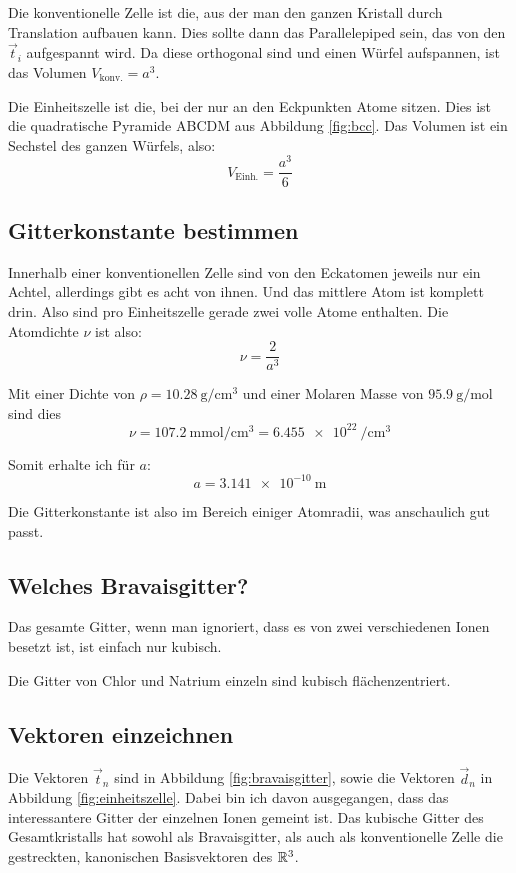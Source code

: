 Die konventionelle Zelle ist die, aus der man den ganzen Kristall durch
Translation aufbauen kann. Dies sollte dann das Parallelepiped sein, das von
den $\vec t_i$ aufgespannt wird. Da diese orthogonal sind und einen Würfel
aufspannen, ist das Volumen $V_\text{konv.} = a^3$.

Die Einheitszelle ist die, bei der nur an den Eckpunkten Atome sitzen. Dies ist
die quadratische Pyramide ABCDM aus Abbildung \ref{fig:bcc}. Das Volumen ist
ein Sechstel des ganzen Würfels, also:
\[
	V_\text{Einh.} = \frac{a^3}6
\]

\subsection{Gitterkonstante bestimmen}

Innerhalb einer konventionellen Zelle sind von den Eckatomen jeweils nur ein
Achtel, allerdings gibt es acht von ihnen. Und das mittlere Atom ist komplett
drin. Also sind pro Einheitszelle gerade zwei volle Atome enthalten. Die
Atomdichte $\nu$ ist also:
\[
	\nu = \frac{2}{a^3}
\]

Mit einer Dichte von $\rho = \SI{10.28}{\gram\per\centi\meter\cubed}$ und einer
Molaren Masse von $\SI{95.9}{\gram\per\mol}$ sind dies
\[
	\nu
	= \SI{107.2}{\milli\mol\per\centi\meter\cubed}
	= \SI{6.455e22}{\per\centi\meter\cubed}
\]

Somit erhalte ich für $a$:
\[
	a = \SI{3.141e-10}{\meter}
\]

Die Gitterkonstante ist also im Bereich einiger Atomradii, was anschaulich gut
passt.

\subsection{Welches Bravaisgitter?}

Das gesamte Gitter, wenn man ignoriert, dass es von zwei verschiedenen Ionen
besetzt ist, ist einfach nur kubisch.

Die Gitter von Chlor und Natrium einzeln sind kubisch flächenzentriert.

\subsection{Vektoren einzeichnen}

Die Vektoren $\vec t_n$ sind in Abbildung \ref{fig:bravaisgitter}, sowie die
Vektoren $\vec d_n$ in Abbildung \ref{fig:einheitszelle}. Dabei bin ich davon
ausgegangen, dass das interessantere Gitter der einzelnen Ionen gemeint ist.
Das kubische Gitter des Gesamtkristalls hat sowohl als Bravaisgitter, als auch
als konventionelle Zelle die gestreckten, kanonischen Basisvektoren des $\mathbb R^3$.


